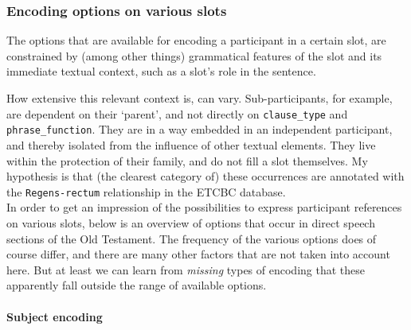 \documentclass{report}
\newcommand{\mi}[1]{\lstinline{#1}}
\begin{document}
\subsubsection{Encoding options on various slots}
The options that are available for encoding a participant in a certain slot, are constrained by (among other things) grammatical features of the slot and its immediate textual context, such as a slot's role in the sentence.

How extensive this relevant context is, can vary. Sub-participants, for example, are dependent on their `parent', and not directly on \mi{clause_type} and \mi{phrase_function}. They are in a way embedded in an independent participant, and thereby isolated from the influence of other textual elements. They live within the protection of their family, and do not fill a slot themselves. My hypothesis is that (the clearest category of) these occurrences are annotated with the \mi{Regens-rectum} relationship in the ETCBC database.\\

In order to get an impression of the possibilities to express participant references on various slots, below is an overview of options that occur in direct speech sections of the Old Testament. The frequency of the various options does of course differ, and there are many other factors that are not taken into account here. But at least we can learn from \emph{missing} types of encoding that these apparently fall outside the range of available options.

\paragraph{Subject encoding}
\end{document}
